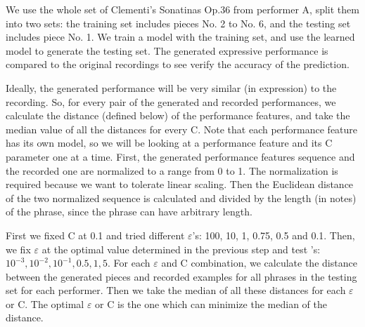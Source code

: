 We use the whole set of Clementi's Sonatinas Op.36 from performer A, split them into two sets: the training set includes pieces No. 2 to No. 6, and the testing set includes piece No. 1. We train a model with the training set, and use the learned model to generate the testing set. The generated expressive performance is compared to the original recordings to see verify the accuracy of the prediction.



Ideally, the generated performance will be very similar (in expression) to the recording. So, for every pair of the generated and recorded performances, we calculate the distance (defined below) of the performance features, and take the median value of all the distances for every C. Note that each performance feature has its own model, so we will be looking at a performance feature and its C parameter one at a time.  
First, the generated performance features sequence and the recorded one are normalized to a range from 0 to 1. The normalization is required because we want to tolerate linear scaling. Then the Euclidean distance of the two normalized sequence is calculated and divided by the length (in notes) of the phrase, since the phrase can have arbitrary length.


First we fixed C at 0.1 and tried different $\varepsilon$'s: 100, 10, 1, 0.75, 0.5 and 0.1. Then, we fix $\varepsilon$ at the optimal value determined in the previous step and test 's: $10^{-3}, 10^{-2}, 10^{-1}, 0.5, 1, 5$. For each $\varepsilon$ and C combination, we calculate the distance between the generated pieces and recorded examples for all phrases in the testing set for each performer. Then we take the median of all these distances for each $\varepsilon$ or C. The optimal $\varepsilon$ or C is the one which can minimize the median of the distance.


